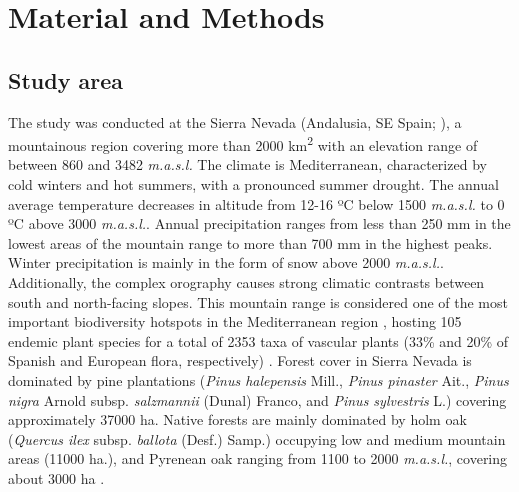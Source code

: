 \section{Material and Methods}\label{sec:multivar:MatMet}
\subsection{Study area}\label{sec:multivar:StudyArea}
The study was conducted at the Sierra Nevada (Andalusia, SE Spain; ), a mountainous region covering more than 2000 km\textsuperscript{2} with an elevation range of between 860 and 3482 \emph{m.a.s.l.} The climate is Mediterranean, characterized by cold winters and hot summers, with a pronounced summer drought. The annual average temperature decreases in altitude from 12-16 ºC below 1500 \emph{m.a.s.l.} to 0 ºC above 3000 \emph{m.a.s.l.}. Annual precipitation ranges from less than 250 mm in the lowest areas of the mountain range to more than 700 mm in the highest peaks. Winter precipitation is mainly in the form of snow above 2000 \emph{m.a.s.l.}. Additionally, the complex orography causes strong climatic contrasts between south and north-facing slopes. This mountain range is considered one of the most important biodiversity hotspots in the Mediterranean region \autocite{Blancaetal1998ThreatenedVascular}, hosting 105 endemic plant species for a total of 2353 taxa of vascular plants (33\% and 20\% of Spanish and European flora, respectively) \autocite{Lorite2016UpdatedChecklist}. Forest cover in Sierra Nevada is dominated by pine plantations (\emph{Pinus halepensis} Mill., \emph{Pinus pinaster} Ait., \emph{Pinus nigra} Arnold subsp. \emph{salzmannii} (Dunal) Franco, and \emph{Pinus sylvestris} L.) covering approximately 37000 ha. Native forests are mainly dominated by holm oak (\emph{Quercus ilex} subsp. \emph{ballota} (Desf.) Samp.) occupying low and medium mountain areas (11000 ha.), and Pyrenean oak \Qpy ranging from 1100 to 2000 \emph{m.a.s.l.}, covering about 3000 ha \autocite{PerezLuqueetal2019MapEcosystems}.

